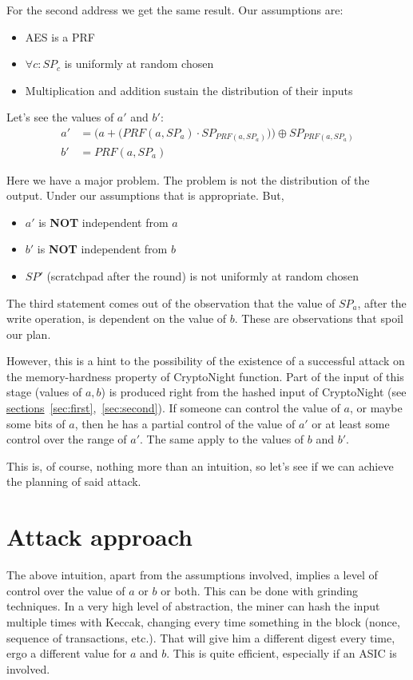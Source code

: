 For the second address we get the same result. Our assumptions are:
\begin{itemize}
  \item AES is a PRF
  \item $\forall c : SP_c$ is uniformly at random chosen
  \item Multiplication and addition sustain the distribution of their inputs
\end{itemize}

Let's see the values of $a'$ and $b'$:
\begin{align} \label{eq:normal_1}
  a' &= \Big( a + \big( PRF(a, SP_{a}) \cdot SP_{PRF(a, SP_a)} \big) \Big) \oplus SP_{PRF(a, SP_a)}\\ b' &= PRF(a, SP_{a}) \label{eq:normal_2}
\end{align}

Here we have a major problem. The problem is not the distribution of the output. Under our assumptions that is appropriate. But,
\begin{itemize}
  \item $a'$ is \textbf{NOT} independent from $a$
  \item $b'$ is \textbf{NOT} independent from $b$
  \item $SP'$ (scratchpad after the round) is not uniformly at random chosen
\end{itemize}
The third statement comes out of the observation that the value of $SP_a$, after the write operation, is dependent on the value of $b$. These are observations that spoil our plan.

However, this is a hint to the possibility of the existence of a successful attack on the memory-hardness property of CryptoNight function. Part of the input of this stage (values of $a,b$) is produced right from the hashed input of CryptoNight (see \hyperref[sec:first]{sections}~\ref{sec:first},~\ref{sec:second}). If someone can control the value of $a$, or maybe some bits of $a$, then he has a partial control of the value of $a'$ or at least some control over the range of $a'$. The same apply to the values of $b$ and $b'$.

This is, of course, nothing more than an intuition, so let's see if we can achieve the planning of said attack.
\section{Attack approach}
The above intuition, apart from the assumptions involved, implies a level of control over the value of $a$ or $b$ or both. This can be done with grinding techniques. In a very high level of abstraction, the miner can hash the input multiple times with Keccak, changing every time something in the block (nonce, sequence of transactions, etc.). That will give him a different digest every time, ergo a different value for $a$ and $b$. This is quite efficient, especially if an ASIC is involved.

